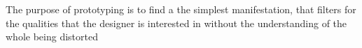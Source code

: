 \begin{principle} \label{prin:fundamental_prototyping_principle}  
  The purpose of prototyping is to find a the simplest manifestation, that filters for the qualities that the designer is interested in without the understanding of the whole being distorted \cite[p. 7:4]{lim}
\end{principle}